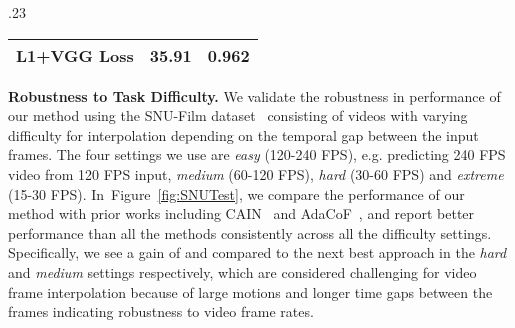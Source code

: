 \documentclass[10pt,twocolumn,letterpaper]{article}
\newcommand{\figref}[1]{Figure~\ref{#1}}
\newcommand{\Ours}{FLAVR}
\begin{document}
\begin{table*}[!t]
\begin{table*}[h]
\begin{subtable}[t]{.23\textwidth}
{\begin{tabular}{l|cc}
L1+VGG Loss      &	35.91   &	0.962 \\
\bottomrule
\end{tabular}}
\captionsetup{width=.9\textwidth}
\label{tab:lossFn}
\end{subtable}
\captionsetup{width=\textwidth}
\vspace{-8pt}
\caption{{\bf Ablation results} for \Ours{} architecture on  different backbones,  fusion methods,  temporal striding, and  loss functions.}
\label{tab:ablations}
\vspace{-8pt}
\end{table*} 
{\bf Robustness to Task Difficulty.}
We validate the robustness in performance of our method using the SNU-Film dataset~\cite{choi2020channel} consisting of videos with varying difficulty for interpolation depending on the temporal gap between the input frames.
The four settings we use are \textit{easy} (120-240 FPS), e.g. predicting 240 FPS video from 120 FPS input, \textit{medium} (60-120 FPS), \textit{hard} (30-60 FPS) and \textit{extreme} (15-30 FPS). In~\figref{fig:SNUTest}, we compare the performance of our method with prior works including CAIN~\cite{choi2020channel} and AdaCoF~\cite{lee2020adacof}, and report better performance than all the methods consistently across all the difficulty settings. Specifically, we see a gain of  and  compared to the next best approach \cite{choi2020channel} in the \textit{hard} and \textit{medium} settings respectively, which are considered challenging for video frame interpolation because of large motions and longer time gaps between the frames indicating robustness to video frame rates.






\end{table*}
\end{document}
